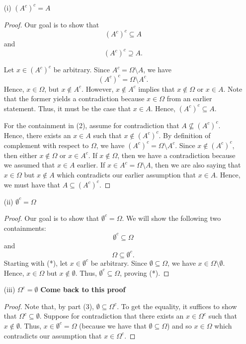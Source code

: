 \documentclass[a4paper]{article}
\begin{document}
\begin{enumerate}
    \item[(i)] \( (A^{c})^{c} = A \)
    \begin{proof}
        Our goal is to show that 
        \[ (A^{c})^{c} \subseteq A \tag{1}  \] and 
        \[ (A^{c})^{c} \supseteq A \tag{2}. \]

        Let \( x \in (A^{c})^{c} \) be arbitrary. Since \( A^{c} = \Omega \setminus  A  \), we have  
        \[  (A^{c})^{c} =  \Omega \setminus  A^{c}. \]
        Hence, \( x \in \Omega \), but \( x \notin A^{c} \). However, \( x \notin A^{c} \) implies that \( x \notin \Omega \) or \( x \in A  \). Note that the former yields a contradiction because \( x \in \Omega  \) from an earlier statement. Thus, it must be the case that \( x \in A \). Hence, \( (A^{c})^{c} \subseteq  A   \).

        For the containment in (2), assume for contradiction that \( A \not\subseteq (A^{c})^{c} \). Hence, there exists an \( x \in A  \) such that \( x \notin (A^{c})^{c} \). By definition of complement with respect to \( \Omega \), we have \( (A^{c})^{c} = \Omega \setminus  A^{c} \). Since \( x \notin (A^{c})^{c} \), then either \( x \notin \Omega \) or \( x \in A^{c}  \). If \( x \notin \Omega \), then we have a contradiction because we assumed that \( x \in A  \) earlier. If \( x \in A^{c} = \Omega \setminus  A  \), then we are also saying that \( x \in \Omega \) but \( x \notin A  \) which contradicts our earlier assumption that \( x \in A  \). Hence, we must have that \( A \subseteq  (A^{c})^{c} \).
    \end{proof}
    \item[(ii)] \( \emptyset^{c} = \Omega \)
    \begin{proof}
    Our goal is to show that \( \emptyset^{c} = \Omega \). We will show the following two containments:
    \[  \emptyset^{c} \subseteq    \Omega \tag{*}  \]
    and
    \[  \Omega \subseteq  \emptyset^{c}. \tag{**} \]
    Starting with (*), let \( x \in \emptyset^{c} \) be arbitrary. Since \( \emptyset \subseteq  \Omega  \), we have \( x \in \Omega \setminus  \emptyset \). Hence, \( x \in \Omega  \) but \( x \notin \emptyset \). Thus, \( \emptyset^{c} \subseteq  \Omega  \), proving (*).
    \end{proof}
    \item[(iii)] \( \Omega^{c} = \emptyset \) \textbf{Come back to this proof}
\begin{proof}
    Note that, by part (3), \( \emptyset \subseteq  \Omega^{c} \). To get the equality, it suffices to show that \( \Omega^{c} \subseteq  \emptyset \). Suppose for contradiction that there exists an \( x \in \Omega^{c} \) such that \( x \notin \emptyset \). Thus, \( x \in \emptyset^{c } = \Omega \) (because we have that \( \emptyset \subseteq  \Omega \)) and so \( x \in \Omega \) which contradicts our assumption that \( x \in \Omega^{c} \). 
\end{proof}
\end{enumerate}
\end{document}
